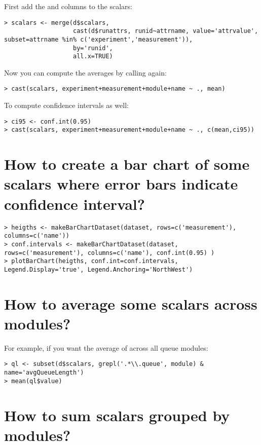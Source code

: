 First add the  and  columns to the scalars:

\begin{verbatim}
> scalars <- merge(d$scalars,
                   cast(d$runattrs, runid~attrname, value='attrvalue', subset=attrname %in% c('experiment','measurement')),
                   by='runid',
                   all.x=TRUE)
\end{verbatim}

Now you can compute the averages by calling  again:

\begin{verbatim}
> cast(scalars, experiment+measurement+module+name ~ ., mean)
\end{verbatim}

To compute confidence intervals as well:

\begin{verbatim}
> ci95 <- conf.int(0.95)
> cast(scalars, experiment+measurement+module+name ~ ., c(mean,ci95))
\end{verbatim}

\section{How to create a bar chart of some scalars where error bars indicate confidence interval?}

\begin{verbatim}
> heigths <- makeBarChartDataset(dataset, rows=c('measurement'), columns=c('name'))
> conf.intervals <- makeBarChartDataset(dataset, rows=c('measurement'), columns=c('name'), conf.int(0.95) )
> plotBarChart(heigths, conf.int=conf.intervals, Legend.Display='true', Legend.Anchoring='NorthWest')
\end{verbatim}

\section{How to average some scalars across modules?}

For example, if you want the average of  across all queue modules:

\begin{verbatim}
> ql <- subset(d$scalars, grepl('.*\\.queue', module) & name='avgQueueLength')
> mean(ql$value)
\end{verbatim}

\section{How to sum scalars grouped by modules?}

